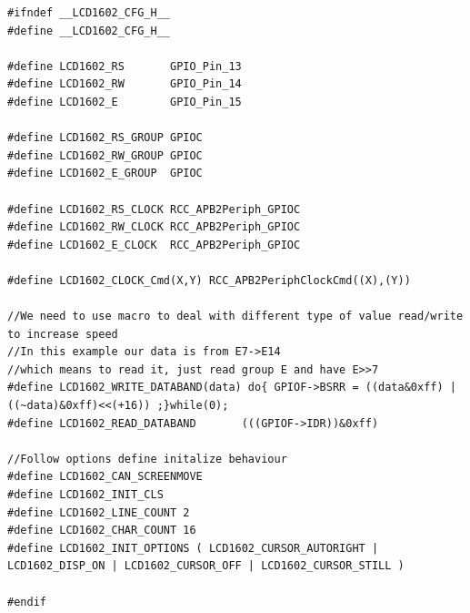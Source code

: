 \documentclass[a4paper]{ctexart}
\begin{document}
\begin{lstlisting}[caption={File lcd1602\_config.h},label={lcd1602ch}]
#ifndef __LCD1602_CFG_H__
#define __LCD1602_CFG_H__

#define LCD1602_RS 		 GPIO_Pin_13
#define LCD1602_RW 		 GPIO_Pin_14
#define LCD1602_E  		 GPIO_Pin_15

#define LCD1602_RS_GROUP GPIOC
#define LCD1602_RW_GROUP GPIOC
#define LCD1602_E_GROUP  GPIOC

#define LCD1602_RS_CLOCK RCC_APB2Periph_GPIOC
#define LCD1602_RW_CLOCK RCC_APB2Periph_GPIOC
#define LCD1602_E_CLOCK  RCC_APB2Periph_GPIOC

#define LCD1602_CLOCK_Cmd(X,Y) RCC_APB2PeriphClockCmd((X),(Y))

//We need to use macro to deal with different type of value read/write to increase speed
//In this example our data is from E7->E14
//which means to read it, just read group E and have E>>7
#define LCD1602_WRITE_DATABAND(data) do{ GPIOF->BSRR = ((data&0xff) | ((~data)&0xff)<<(+16)) ;}while(0);
#define LCD1602_READ_DATABAND 		(((GPIOF->IDR))&0xff)

//Follow options define initalize behaviour
#define LCD1602_CAN_SCREENMOVE
#define LCD1602_INIT_CLS
#define LCD1602_LINE_COUNT 2
#define LCD1602_CHAR_COUNT 16
#define LCD1602_INIT_OPTIONS ( LCD1602_CURSOR_AUTORIGHT | LCD1602_DISP_ON | LCD1602_CURSOR_OFF | LCD1602_CURSOR_STILL )

#endif
\end{lstlisting}
\end{document}
